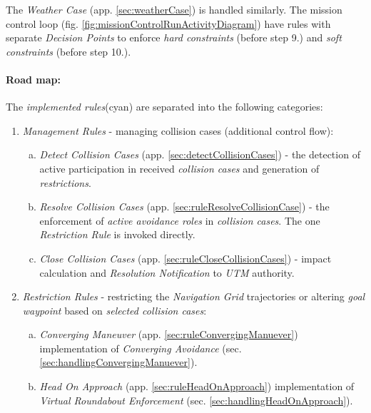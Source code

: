 \begin{note}
    The \emph{Weather Case} (app. \ref{sec:weatherCase}) is handled similarly. The mission control loop (fig. \ref{fig:missionControlRunActivityDiagram}) have rules with separate \emph{Decision Points} to enforce \emph{hard constraints} (before step 9.) and \emph{soft constraints} (before step 10.).
\end{note}

\paragraph{Road map:} The \emph{implemented rules}(cyan) are separated into the following categories:
\begin{enumerate}
    \item \emph{Management Rules} - managing collision cases (additional control flow):
        \begin{enumerate}[a.]
            
            \item \emph{Detect Collision Cases} (app. \ref{sec:detectCollisionCases}) - the detection of active participation in received \emph{collision cases} and generation of \emph{restrictions}.
            
            \item \emph{Resolve Collision Cases} (app. \ref{sec:ruleResolveCollisionCase}) - the enforcement of \emph{active avoidance roles} in \emph{collision cases}. The one \emph{Restriction Rule} is invoked directly.
            
            \item \emph{Close Collision Cases} (app. \ref{sec:ruleCloseCollisionCases}) - impact calculation and \emph{Resolution Notification} to \emph{UTM} authority.
        \end{enumerate}
    
    \item \emph{Restriction Rules} - restricting the \emph{Navigation Grid} trajectories or altering \emph{goal waypoint} based on \emph{selected collision cases}:
    \begin{enumerate}[a.]
        \item \emph{Converging Maneuver} (app. \ref{sec:ruleConvergingManuever}) implementation of \emph{Converging Avoidance} (sec. \ref{sec:handlingConvergingManuever}).
        
        \item \emph{Head On Approach} (app. \ref{sec:ruleHeadOnApproach}) implementation of \emph{Virtual Roundabout Enforcement} (sec. \ref{sec:handlingHeadOnApproach}).
        

\end{enumerate}
\end{enumerate}
